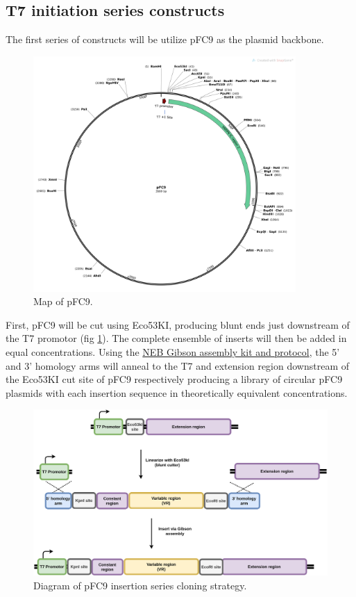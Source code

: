 \documentclass[11pt]{article}
\begin{document}
\subsection{T7 initiation series constructs}
\label{T7:init} 

The first series of constructs will be utilize pFC9 as the plasmid backbone.   

\begin{figure}[H]
	\includegraphics[width=10cm]{images/pFC9_Map.png}
	\centering
	\caption{Map of pFC9.}
	\label{fig:pFC9}
\end{figure}

First, pFC9 will be cut using Eco53KI, producing blunt ends just downstream of the T7 promotor (fig \ref{fig:pFC9}). The complete ensemble of inserts will then be added in equal concentrations. Using the \href{https://www.neb.com/protocols/2012/12/11/gibson-assembly-protocol-e5510}{NEB Gibson assembly kit and protocol}, the 5' and 3' homology arms will anneal to the T7 and extension region downstream of the Eco53KI cut site of pFC9 respectively producing a library of circular pFC9 plasmids with each insertion sequence in theoretically equivalent concentrations. 

\begin{figure}[h!]
	\includegraphics[width=15cm]{images/initiation_assembly_pFC9.png}
	\centering
	\caption{Diagram of pFC9 insertion series cloning strategy.}
\end{figure}
\end{document}
